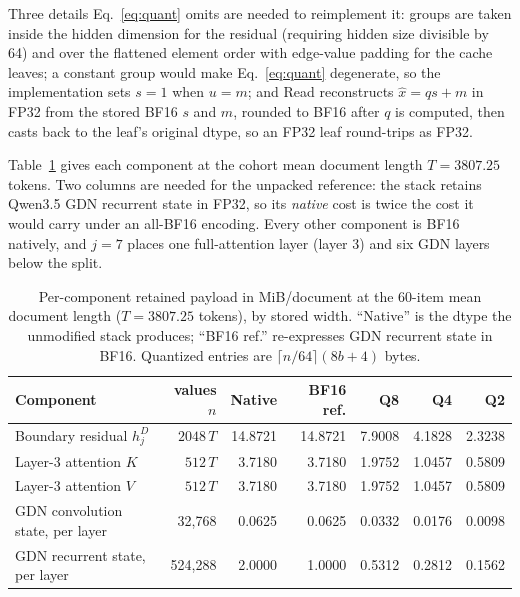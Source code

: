 \documentclass{article}
\begin{document}
Three details Eq.~\ref{eq:quant} omits are needed to reimplement it: groups are
taken inside the hidden dimension for the residual (requiring hidden size
divisible by 64) and over the flattened element order with edge-value padding for
the cache leaves; a constant group would make Eq.~\ref{eq:quant} degenerate, so
the implementation sets $s=1$ when $u=m$; and Read reconstructs $\hat x=qs+m$ in
FP32 from the stored BF16 $s$ and $m$, rounded to BF16 after $q$ is computed, then
casts back to the leaf's original dtype, so an FP32 leaf round-trips as FP32.

Table~\ref{tab:store-components} gives each component at the cohort mean
document length $T=3807.25$ tokens.  Two columns are needed for the unpacked
reference: the stack retains Qwen3.5 GDN recurrent state in FP32, so its
\emph{native} cost is twice the cost it would carry under an all-BF16 encoding.
Every other component is BF16 natively, and $j=7$ places one full-attention
layer (layer 3) and six GDN layers below the split.

\begin{table}[H]
  \caption{Per-component retained payload in MiB/document at the 60-item mean
document length ($T=3807.25$ tokens), by stored width.  ``Native'' is the dtype
the unmodified stack produces; ``BF16 ref.'' re-expresses GDN recurrent state
in BF16.  Quantized entries are $\lceil n/64\rceil(8b+4)$ bytes.}
  \label{tab:store-components}
  \centering\small
  \begin{tabular}{@{}lrrrrrr@{}}
    \toprule
    Component & values $n$ & Native & BF16 ref. & Q8 & Q4 & Q2 \\
    \midrule
    Boundary residual $h_j^D$ & $2048\,T$ & 14.8721 & 14.8721 & 7.9008 & 4.1828 & 2.3238 \\
    Layer-3 attention $K$ & $512\,T$ & 3.7180 & 3.7180 & 1.9752 & 1.0457 & 0.5809 \\
    Layer-3 attention $V$ & $512\,T$ & 3.7180 & 3.7180 & 1.9752 & 1.0457 & 0.5809 \\
    GDN convolution state, per layer & 32{,}768 & 0.0625 & 0.0625 & 0.0332 & 0.0176 & 0.0098 \\
    GDN recurrent state, per layer & 524{,}288 & 2.0000 & 1.0000 & 0.5312 & 0.2812 & 0.1562 \\
    \bottomrule
  \end{tabular}
\end{table}
\end{document}
